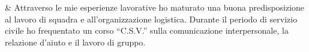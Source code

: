 & Attraverso le mie esperienze lavorative ho maturato una buona predisposizione al lavoro di squadra e all'organizzazione logistica. Durante il periodo di servizio civile ho frequentato un corso ``C.S.V.'' sulla comunicazione interpersonale, la relazione d'aiuto e il lavoro di gruppo.\\